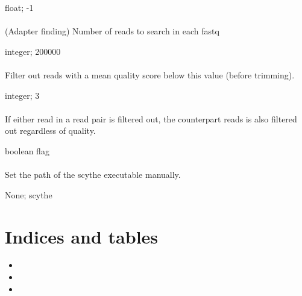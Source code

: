 \documentclass[letterpaper,11pt,english]{sphinxmanual}
\begin{document}
 float;  -1


\subsubsection{}
\label{\detokenize{prog_desc:n-adapter-number-of-reads}}
 (Adapter finding) Number of reads to search in each fastq

 integer;  200000


\subsubsection{}
\label{\detokenize{prog_desc:q-filter-quality}}
 Filter out reads with a mean quality score below this value (before trimming).

 integer;  3


\subsubsection{}
\label{\detokenize{prog_desc:u-filter-unpaired}}
 If either read in a read pair is filtered out, the counterpart reads is also filtered out regardless of quality.

 boolean flag


\subsubsection{}
\label{\detokenize{prog_desc:x-scythe-executable}}
 Set the path of the scythe executable manually.

 None;  scythe


\chapter{Indices and tables}
\label{\detokenize{index:indices-and-tables}}\begin{itemize}
\item {} 

\item {} 

\item {} 

\end{itemize}



\renewcommand{\indexname}{Index}
\printindex
\end{document}

